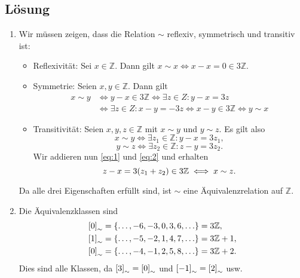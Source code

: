 \documentclass[german,12pt]{homework}
\newcommand{\ZZ}{\mathbb{Z}}
\DeclarePairedDelimiter{\enbrace}{(}{)}
\DeclarePairedDelimiter{\benbrace}{[}{]}
\DeclarePairedDelimiter{\penbrace}{\{}{\}}
\begin{document}
    \subsection*{Lösung}
    \begin{enumerate}
        \item Wir müssen zeigen, dass die Relation \(\sim\) reflexiv, symmetrisch und transitiv ist:
        \begin{itemize}
            \item Reflexivität: Sei \(x \in \ZZ\). Dann gilt \(x \sim x \iff x - x = 0 \in 3\ZZ\).
            \item Symmetrie: Seien \(x, y \in \ZZ\). Dann gilt
            \begin{align*}
                x \sim y &\iff y - x \in 3\ZZ \iff \exists{z \in Z}: y - x = 3z\\
                &\iff\exists{z \in Z}: x - y = -3z \iff x - y \in 3\ZZ \iff y \sim x
            \end{align*}
            \item Transitivität: Seien \(x, y, z \in \ZZ\) mit \(x \sim y\) und \(y \sim z\). Es gilt also
            \begin{equation}\label{eq:1}
                x \sim y \iff \exists{z_1 \in \ZZ}: y - x = 3z_1,
            \end{equation}
            \begin{equation}\label{eq:2}
                y \sim z \iff \exists{z_2 \in \ZZ}: z - y = 3z_2.
            \end{equation}
            Wir addieren nun \eqref{eq:1} und \eqref{eq:2} und erhalten
            \[z - x = 3\enbrace*{z_1 + z_2} \in 3\ZZ \iff x \sim z.\]
        \end{itemize}
        Da alle drei Eigenschaften erfüllt sind, ist \(\sim\) eine Äquivalenzrelation auf \(\ZZ\).
        \item Die Äquivalenzklassen sind
        \begin{align*}
            \benbrace*{0}_\sim &= \penbrace*{\ldots, -6, -3, 0, 3, 6, \ldots} = 3\ZZ,\\
            \benbrace*{1}_\sim &= \penbrace*{\ldots, -5, -2, 1, 4, 7, \ldots} = 3\ZZ + 1,\\
            \benbrace*{0}_\sim &= \penbrace*{\ldots, -4, -1, 2, 5, 8, \ldots} = 3\ZZ + 2.
        \end{align*}
        Dies sind alle Klassen, da \(\benbrace*{3}_\sim = \benbrace*{0}_\sim\) und \(\benbrace*{-1}_\sim = \benbrace*{2}_\sim\) usw.
    \end{enumerate}
\end{document}
